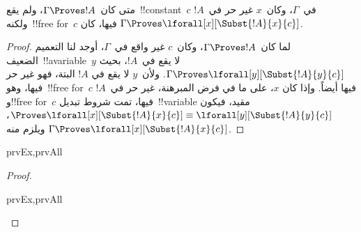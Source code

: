 \documentclass[../../../include/open-logic-section]{subfiles}
\begin{document}
\begin{thm}
متى كان~$\Gamma \Proves !A$، ولم يقع~!!{constant}~$c$ في~$\Gamma$،
وكان~$x$ غير حر في~$!A$ ولكنه~!!{free for}~$c$ فيها، كان
$\Gamma \Proves \lforall[x][\Subst{!A}{x}{c}]$.
\end{thm}

\begin{proof}
لما كان~$\Gamma \Proves !A$، وكان~$c$ غير واقع في~$\Gamma$، أوجد لنا
التعميم الضعيف~!!a{variable}~$y$ لا يقع في~$!A$، بحيث
$\Gamma \Proves \lforall[y][\Subst{!A}{y}{c}]$. ولأن~$y$ لا يقع في
$!A$ البتة، فهو غير حر فيها، وهو~!!{free for}~$c$ فيها أيضاً. وإذا كان
$x$، على ما في فرض المبرهنة، غير حر في~$!A$ و!!{free for}~$c$ فيها،
تمت شروط تبديل~!!{variable} مقيد، فيكون
$\Proves \lforall[x][\Subst{!A}{x}{c}] \equiv
\lforall[y][\Subst{!A}{y}{c}]$، ويلزم منه
$\Gamma \Proves \lforall[x][\Subst{!A}{x}{c}]$.
\end{proof}

\begin{thm}
\begin{tagenumerate}{prvEx,prvAll}
\end{tagenumerate}
\end{thm}

\begin{proof}
\begin{tagenumerate}{prvEx,prvAll}

\end{tagenumerate}
\end{proof}
\end{document}

